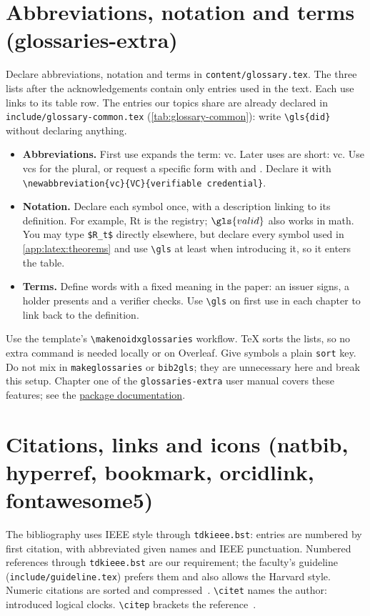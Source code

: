 \section{Abbreviations, notation and terms (glossaries-extra)}\label{app:latex:acro}
Declare abbreviations, notation and terms in \texttt{content/glossary.tex}. The three lists after the acknowledgements contain only entries used in the text. Each use links to its table row. The entries our topics share are already declared in \texttt{include/glossary-common.tex} (\cref{tab:glossary-common}): write \texttt{\textbackslash gls\{did\}} without declaring anything.
\begin{itemize}[noitemsep]
  \item \textbf{Abbreviations.} First use expands the term: \gls{vc}. Later uses are short: \gls{vc}. Use \glspl{vc} for the plural, or request a specific form with  and . Declare it with \texttt{\textbackslash newabbreviation\{vc\}\{VC\}\{verifiable credential\}}.
  \item \textbf{Notation.} Declare each symbol once, with a description linking to its definition. For example, \gls{Rt} is the registry; $\gls{valid}$ also works in math. You may type \texttt{\$R\_t\$} directly elsewhere, but declare every symbol used in \cref{app:latex:theorems} and use \texttt{\textbackslash gls} at least when introducing it, so it enters the table.
  \item \textbf{Terms.} Define words with a fixed meaning in the paper: an \gls{issuer} signs, a \gls{holder} presents and a \gls{verifier} checks. Use \texttt{\textbackslash gls} on first use in each chapter to link back to the definition.
\end{itemize}
Use the template's \texttt{\textbackslash makenoidxglossaries} workflow. TeX sorts the lists, so no extra command is needed locally or on Overleaf. Give symbols a plain \texttt{sort} key. Do not mix in \texttt{makeglossaries} or \texttt{bib2gls}; they are unnecessary here and break this setup. Chapter one of the \texttt{glossaries-extra} user manual covers these features; see the \href{https://ctan.org/pkg/glossaries-extra}{package documentation}.

\section{Citations, links and icons (natbib, hyperref, bookmark, orcidlink, fontawesome5)}\label{app:latex:cite}
The bibliography uses IEEE style through \texttt{tdkieee.bst}: entries are numbered by first citation, with abbreviated given names and IEEE punctuation. Numbered references through \texttt{tdkieee.bst} are our requirement; the faculty's guideline (\texttt{include/guideline.tex}) prefers them and also allows the Harvard style. Numeric citations are sorted and compressed~\cite{guide:w3c2025vcdm,guide:lamport1978time}.
\texttt{\textbackslash citet} names the author: \citet{guide:lamport1978time} introduced logical clocks.
\texttt{\textbackslash citep} brackets the reference~\citep{guide:lamport1978time}.

